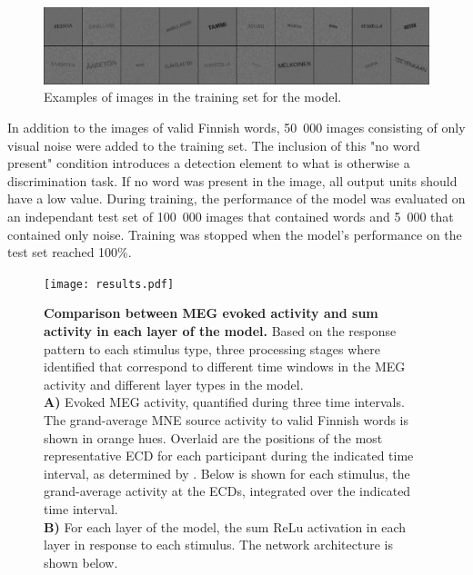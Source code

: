 \documentclass[a4paper, 10pt]{vanvliet_paper}
\begin{document}
\begin{figure}
    \includegraphics[width=\textwidth]{train.png}
    \caption{Examples of images in the training set for the model.}\label{fig:train}
\end{figure}

In addition to the images of valid Finnish words, 50~000 images consisting of only visual noise were added to the training set.
The inclusion of this "no word present" condition introduces a detection element to what is otherwise a discrimination task.
If no word was present in the image, all output units should have a low value.
During training, the performance of the model was evaluated on an independant test set of 100~000 images that contained words and 5~000 that contained only noise.
Training was stopped when the model's performance on the test set reached 100\%.

\begin{figure}
    \texttt{[image: results.pdf]}
    \vspace{2ex}
    \caption{
        \textbf{Comparison between \gls{MEG} evoked activity and sum activity in each layer of the model.}
        Based on the response pattern to each stimulus type, three processing stages where identified that correspond to different time windows in the \gls{MEG} activity and different layer types in the model.\\
        \textbf{A)} Evoked \gls{MEG} activity, quantified during three time intervals.
        The grand-average \gls{MNE} source activity to valid Finnish words is shown in orange hues.
        Overlaid are the positions of the most representative \gls{ECD} for each participant during the indicated time interval, as determined by \textcite{Vartiainen2011}.
        Below is shown for each stimulus, the grand-average activity at the \glspl{ECD}, integrated over the indicated time interval.\\
        \textbf{B)} For each layer of the model, the sum \gls{ReLu} activation in each layer in response to each stimulus.
        The network architecture is shown below.
    }\label{fig:results}
\end{figure}
\end{document}
